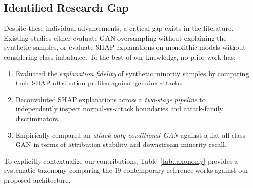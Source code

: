 \documentclass[journal]{IEEEtran}
\begin{document}
\subsection{Identified Research Gap}
Despite these individual advancements, a critical gap exists in the literature. Existing studies either evaluate GAN oversampling without explaining the synthetic samples, or evaluate SHAP explanations on monolithic models without considering class imbalance. To the best of our knowledge, no prior work has:
\begin{enumerate}
    \item Evaluated the \textit{explanation fidelity} of synthetic minority samples by comparing their SHAP attribution profiles against genuine attacks.
    \item Deconvoluted SHAP explanations across a \textit{two-stage pipeline} to independently inspect normal-vs-attack boundaries and attack-family discriminators.
    \item Empirically compared an \textit{attack-only conditional GAN} against a flat all-class GAN in terms of attribution stability and downstream minority recall.
\end{enumerate}

To explicitly contextualize our contributions, Table~\ref{tab:taxonomy} provides a systematic taxonomy comparing the 19 contemporary reference works against our proposed architecture.
\end{document}
